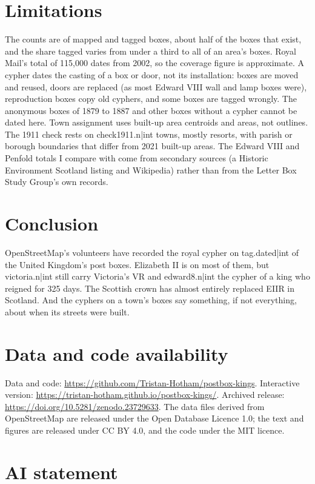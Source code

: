 \documentclass[11pt,a4paper]{article}
\begin{document}
\section{Limitations}

The counts are of mapped and tagged boxes, about half of the boxes that exist, and the share tagged varies from under a third to all of an area's boxes. Royal Mail's total of 115,000 dates from 2002, so the coverage figure is approximate. A cypher dates the casting of a box or door, not its installation: boxes are moved and reused, doors are replaced (as most Edward VIII wall and lamp boxes were), reproduction boxes copy old cyphers, and some boxes are tagged wrongly. The anonymous boxes of 1879 to 1887 and other boxes without a cypher cannot be dated here. Town assignment uses built-up area centroids and areas, not outlines. The 1911 check rests on {{check1911.n|int}} towns, mostly resorts, with parish or borough boundaries that differ from 2021 built-up areas. The Edward VIII and Penfold totals I compare with come from secondary sources (a Historic Environment Scotland listing and Wikipedia) rather than from the Letter Box Study Group's own records.

\section{Conclusion}

OpenStreetMap's volunteers have recorded the royal cypher on {{tag.dated|int}} of the United Kingdom's post boxes. Elizabeth II is on most of them, but {{victoria.n|int}} still carry Victoria's VR and {{edward8.n|int}} the cypher of a king who reigned for 325 days. The Scottish crown has almost entirely replaced EIIR in Scotland. And the cyphers on a town's boxes say something, if not everything, about when its streets were built.

\section*{Data and code availability}

Data and code: \url{https://github.com/Tristan-Hotham/postbox-kings}. Interactive version: \url{https://tristan-hotham.github.io/postbox-kings/}. Archived release: \url{https://doi.org/10.5281/zenodo.23729633}. The data files derived from OpenStreetMap are released under the Open Database Licence 1.0; the text and figures are released under CC BY 4.0, and the code under the MIT licence.

\section*{AI statement}
\end{document}
